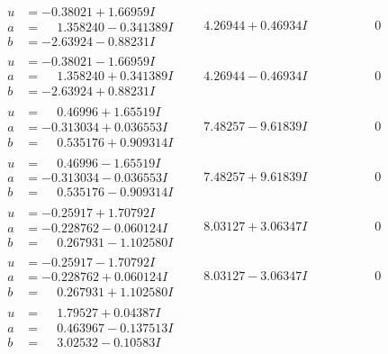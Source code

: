 \documentclass[1p]{elsarticle_modified}
\theoremstyle{definition}
\begin{document}
$$\begin{array}{c|c|c}
\begin{aligned}
u &= -0.38021 + 1.66959 I \\
a &= \phantom{-}1.358240 - 0.341389 I \\
b &= -2.63924 - 0.88231 I\end{aligned}
 & \phantom{-}4.26944 + 0.46934 I & \phantom{-0.000000 } 0 \\ \hline\begin{aligned}
u &= -0.38021 - 1.66959 I \\
a &= \phantom{-}1.358240 + 0.341389 I \\
b &= -2.63924 + 0.88231 I\end{aligned}
 & \phantom{-}4.26944 - 0.46934 I & \phantom{-0.000000 } 0 \\ \hline\begin{aligned}
u &= \phantom{-}0.46996 + 1.65519 I \\
a &= -0.313034 + 0.036553 I \\
b &= \phantom{-}0.535176 + 0.909314 I\end{aligned}
 & \phantom{-}7.48257 - 9.61839 I & \phantom{-0.000000 } 0 \\ \hline\begin{aligned}
u &= \phantom{-}0.46996 - 1.65519 I \\
a &= -0.313034 - 0.036553 I \\
b &= \phantom{-}0.535176 - 0.909314 I\end{aligned}
 & \phantom{-}7.48257 + 9.61839 I & \phantom{-0.000000 } 0 \\ \hline\begin{aligned}
u &= -0.25917 + 1.70792 I \\
a &= -0.228762 - 0.060124 I \\
b &= \phantom{-}0.267931 - 1.102580 I\end{aligned}
 & \phantom{-}8.03127 + 3.06347 I & \phantom{-0.000000 } 0 \\ \hline\begin{aligned}
u &= -0.25917 - 1.70792 I \\
a &= -0.228762 + 0.060124 I \\
b &= \phantom{-}0.267931 + 1.102580 I\end{aligned}
 & \phantom{-}8.03127 - 3.06347 I & \phantom{-0.000000 } 0 \\ \hline\begin{aligned}
u &= \phantom{-}1.79527 + 0.04387 I \\
a &= \phantom{-}0.463967 - 0.137513 I \\
b &= \phantom{-}3.02532 - 0.10583 I\end{aligned}

\end{array}$$
\end{document}
